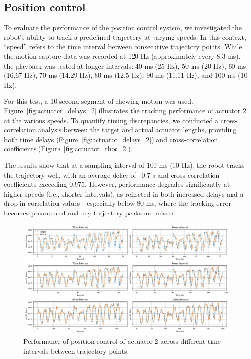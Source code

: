 \subsection{Position control}

To evaluate the performance of the position control system, we investigated the robot's ability to track a predefined trajectory at varying speeds. 
In this context, “speed” refers to the time interval between consecutive trajectory points. While the motion capture data was recorded at 120 Hz 
(approximately every 8.3 ms), the playback was tested at longer intervals: 40 ms (25 Hz), 50 ms (20 Hz), 60 ms (16.67 Hz), 70 ms (14.29 Hz), 80 ms 
(12.5 Hz), 90 ms (11.11 Hz), and 100 ms (10 Hz).

For this test, a 10-second segment of chewing motion was used. Figure~\ref{fig:actuator_delays_2} illustrates the tracking performance of actuator 2 
at the various speeds. To quantify timing discrepancies, we conducted a cross-correlation analysis between the target and actual actuator lengths, 
providing both time delays (Figure~\ref{fig:actuator_delays_2}) and cross-correlation coefficients (Figure~\ref{fig:actuator_rhos_2}).

The results show that at a sampling interval of 100 ms (10 Hz), the robot tracks the trajectory well, with an average delay of ~0.7 s and 
cross-correlation coefficients exceeding 0.975. However, performance degrades significantly at higher speeds (i.e., shorter intervals), 
as reflected in both increased delays and a drop in correlation values—especially below 80 ms, where the tracking error becomes pronounced 
and key trajectory peaks are missed.

\begin{figure}[H]
    \centering
    \includegraphics[width=\textwidth]{figures/actuator_2_trajectories.png}
    \caption{Performance of position control of actuator 2 across different time intervals between trajectory points.}
    \label{fig:position_control}
\end{figure}

